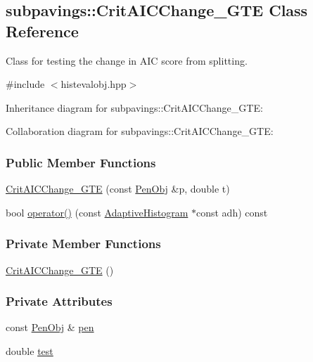 \hypertarget{classsubpavings_1_1CritAICChange__GTE}{\subsection{subpavings\-:\-:\-Crit\-A\-I\-C\-Change\-\_\-\-G\-T\-E \-Class \-Reference}
\label{classsubpavings_1_1CritAICChange__GTE}
}


\-Class for testing the change in \-A\-I\-C score from splitting.  




{\ttfamily \#include $<$histevalobj.\-hpp$>$}



\-Inheritance diagram for subpavings\-:\-:\-Crit\-A\-I\-C\-Change\-\_\-\-G\-T\-E\-:


\-Collaboration diagram for subpavings\-:\-:\-Crit\-A\-I\-C\-Change\-\_\-\-G\-T\-E\-:
\subsubsection*{\-Public \-Member \-Functions}
\begin{DoxyCompactItemize}
\item 
\hyperlink{classsubpavings_1_1CritAICChange__GTE_a41a080b895b5a5884173e0f307f2cf66}{\-Crit\-A\-I\-C\-Change\-\_\-\-G\-T\-E} (const \hyperlink{classsubpavings_1_1PenObj}{\-Pen\-Obj} \&p, double t)
\item 
bool \hyperlink{classsubpavings_1_1CritAICChange__GTE_a39c3228add1aa1f3f6bba7148d3e0e1b}{operator()} (const \hyperlink{classsubpavings_1_1AdaptiveHistogram}{\-Adaptive\-Histogram} $\ast$const adh) const 
\end{DoxyCompactItemize}
\subsubsection*{\-Private \-Member \-Functions}
\begin{DoxyCompactItemize}
\item 
\hyperlink{classsubpavings_1_1CritAICChange__GTE_a716362b93906871088745553051dac22}{\-Crit\-A\-I\-C\-Change\-\_\-\-G\-T\-E} ()
\end{DoxyCompactItemize}
\subsubsection*{\-Private \-Attributes}
\begin{DoxyCompactItemize}
\item 
const \hyperlink{classsubpavings_1_1PenObj}{\-Pen\-Obj} \& \hyperlink{classsubpavings_1_1CritAICChange__GTE_af7f6dc1d12c5c05c15cde02ea298dc32}{pen}
\item 
double \hyperlink{classsubpavings_1_1CritAICChange__GTE_a117b0b39678df05205f5737ab6e42b92}{test}
\end{DoxyCompactItemize}


